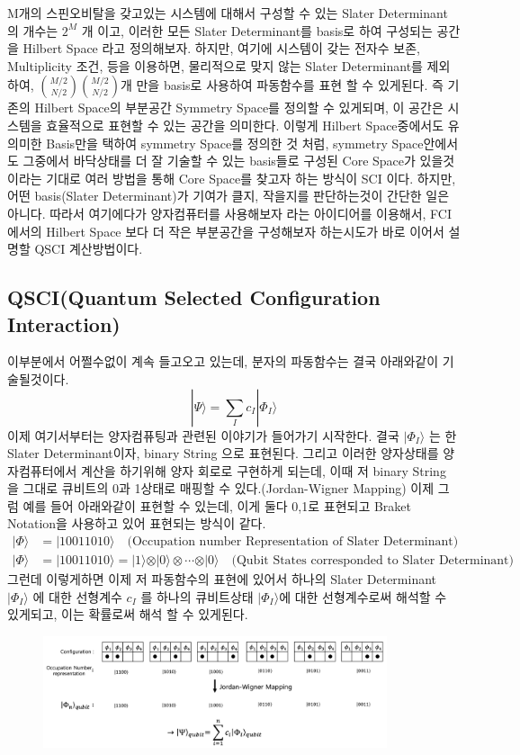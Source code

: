 \documentclass[10pt]{article}
\begin{document}
M개의 스핀오비탈을 갖고있는 시스템에 대해서 구성할 수 있는 Slater Determinant 의 개수는 \(2^M\) 개 이고, 이러한 모든 Slater Determinant를 basis로 하여 구성되는 공간을 Hilbert Space 라고 정의해보자. 
하지만, 여기에 시스템이 갖는 전자수 보존, Multiplicity 조건, 등을 이용하면, 물리적으로 맞지 않는 Slater Determinant를 제외하여, \(\binom{M/2}{N/2}\binom{M/2}{N/2}\)개 만을 basis로 사용하여 파동함수를 
표현 할 수 있게된다. 즉 기존의 Hilbert Space의 부분공간 Symmetry Space를 정의할 수 있게되며, 이 공간은 시스템을 효율적으로 표현할 수 있는 공간을 의미한다.
이렇게 Hilbert Space중에서도 유의미한 Basis만을 택하여 symmetry Space를 정의한 것 처럼, symmetry Space안에서도 그중에서 바닥상태를 더 잘 기술할 수 있는 basis들로 구성된 Core Space가 있을것이라는 
기대로 여러 방법을 통해 Core Space를 찾고자 하는 방식이 SCI 이다. 하지만, 어떤 basis(Slater Determinant)가 기여가 클지, 작을지를 판단하는것이 간단한 일은 아니다.
따라서 여기에다가 양자컴퓨터를 사용해보자 라는 아이디어를 이용해서, FCI 에서의 Hilbert Space 보다 더 작은 부분공간을 구성해보자 하는시도가 바로 이어서 설명할 QSCI 계산방법이다. 


\subsection{QSCI(Quantum Selected Configuration Interaction)}
이부분에서 어쩔수없이 계속 들고오고 있는데, 분자의 파동함수는 결국 아래와같이 기술될것이다. 
\[
|\Psi\rangle = \sum_I c_I |\Phi_I\rangle
\]
이제 여기서부터는 양자컴퓨팅과 관련된 이야기가 들어가기 시작한다. 결국 \(|\Phi_I\rangle\) 는 한 Slater Determinant이자, binary String 으로 표현된다. 
그리고 이러한 양자상태를 양자컴퓨터에서 계산을 하기위해 양자 회로로 구현하게 되는데, 이때 저 binary String 을 그대로 큐비트의 0과 1상태로 매핑할 수 있다.(Jordan-Wigner Mapping)
이제 그럼 예를 들어 아래와같이 표현할 수 있는데, 이게 둘다 0,1로 표현되고 Braket Notation을 사용하고 있어 표현되는 방식이 같다. 
\begin{align*}
|\Phi\rangle  &= \vert 10011010 \rangle \quad \text{(Occupation number Representation of Slater Determinant)} \\
|\Phi\rangle  &= \vert 10011010 \rangle = \vert 1 \rangle \otimes \vert 0 \rangle \otimes \cdots \otimes \vert 0 \rangle \quad \text{(Qubit States corresponded to Slater Determinant)}
\end{align*}
그런데 이렇게하면 이제 저 파동함수의 표현에 있어서 하나의 Slater Determinant \(|\Phi_I\rangle\) 에 대한 선형계수 \(c_I\) 를 
하나의 큐비트상태 \(|\Phi_I\rangle\)에 대한 선형계수로써 해석할 수 있게되고, 이는 확률로써 해석 할 수 있게된다. 
\begin{figure}[htbp]
  \centering
  \includegraphics[width=0.9\textwidth]{fig/QSCI3.png}
  \label{fig:example2}
\end{figure}
\end{document}
